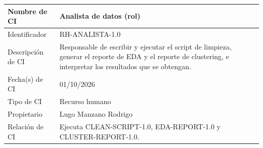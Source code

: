 \documentclass[letterpaper,11pt]{article}
\begin{document}
\noindent\begin{minipage}{\textwidth}
\small\renewcommand{\arraystretch}{1.9}
\begin{tabularx}{\textwidth}{|p{3.3cm}|Y|}
\hline
Nombre de CI & Analista de datos (rol) \\ \hline
Identificador & RH-ANALISTA-1.0 \\ \hline
Descripción de CI & Responsable de escribir y ejecutar el script de limpieza, generar el reporte de EDA y el reporte de clustering, e interpretar los resultados que se obtengan. \\ \hline
Fecha(s) de CI & 01/10/2026 \\ \hline
Tipo de CI & Recurso humano \\ \hline
Propietario & Lugo Manzano Rodrigo \\ \hline
Relación de CI & Ejecuta CLEAN-SCRIPT-1.0, EDA-REPORT-1.0 y CLUSTER-REPORT-1.0. \\ \hline
\end{tabularx}
\end{minipage}\par\bigskip

\nocite{*}


\end{document}
